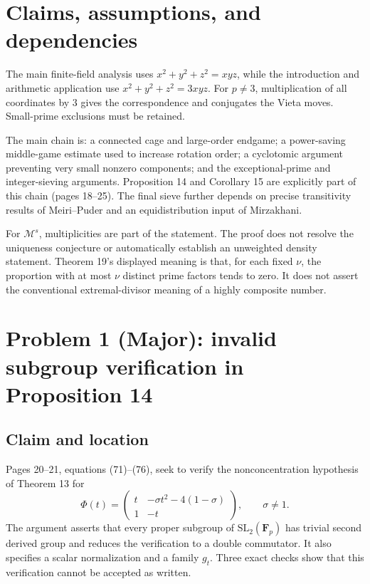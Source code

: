 \documentclass[10pt]{article}
\begin{document}
\section*{Claims, assumptions, and dependencies}
The main finite-field analysis uses \(x^2+y^2+z^2=xyz\), while the introduction and arithmetic application use \(x^2+y^2+z^2=3xyz\). For \(p\ne3\), multiplication of all coordinates by \(3\) gives the correspondence and conjugates the Vieta moves. Small-prime exclusions must be retained.\par
The main chain is: a connected cage and large-order endgame; a power-saving middle-game estimate used to increase rotation order; a cyclotomic argument preventing very small nonzero components; and the exceptional-prime and integer-sieving arguments. Proposition 14 and Corollary 15 are explicitly part of this chain (pages 18–25). The final sieve further depends on precise transitivity results of Meiri–Puder and an equidistribution input of Mirzakhani.\par
For \(\mathcal M^s\), multiplicities are part of the statement. The proof does not resolve the uniqueness conjecture or automatically establish an unweighted density statement. Theorem 19’s displayed meaning is that, for each fixed \(\nu\), the proportion with at most \(\nu\) distinct prime factors tends to zero. It does not assert the conventional extremal-divisor meaning of a highly composite number.\par
\section*{Problem 1 (Major): invalid subgroup verification in Proposition 14}
\subsection*{Claim and location}
Pages 20–21, equations (71)–(76), seek to verify the nonconcentration hypothesis of Theorem 13 for \[\Phi(t)=
 \begin{pmatrix}
 t&-\sigma t^2-4(1-\sigma)\\1&-t
 \end{pmatrix},\qquad \sigma\ne1.\] The argument asserts that every proper subgroup of \(\mathrm{SL}_2(\mathbf F_p)\) has trivial second derived group and reduces the verification to a double commutator. It also specifies a scalar normalization and a family \(g_t\). Three exact checks show that this verification cannot be accepted as written.\par
\end{document}

